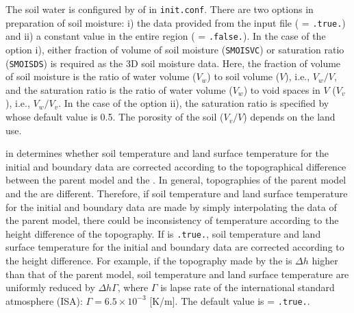 The soil water is configured by  of  in \verb|init.conf|.
There are two options in preparation of soil moisture: i) the data provided from the input file ( = \verb|.true.|) and ii) a constant value in the entire region ( = \verb|.false.|).
In the case of the option i), either fraction of volume of soil moisture (\verb|SMOISVC|) or saturation ratio (\verb|SMOISDS|) is required as the 3D soil moisture data.
Here, the fraction of volume of soil moisture is the ratio of water volume ($V_w$) to soil volume ($V$), i.e., $V_w / V$, 
and the saturation ratio is the ratio of water volume ($V_w$) to void spaces in $V$ ($V_v$), i.e., $V_w / V_v$.
%
In the case of the option ii), the saturation ratio is specified by  whose default value is 0.5.
The porosity of the soil ($V_v/V$) depends on the land use.

 in  determines
whether soil temperature and land surface temperature for the initial and boundary data are corrected
according to the topographical difference between the parent model and the \scalerm.
In general, topographies of the parent model and the \scalerm are different.
Therefore, if soil temperature and land surface temperature for the initial and boundary data are made by simply interpolating the data of the parent model,
there could be inconsistency of temperature according to the height difference of the topography.
If  is \verb|.true.|,
soil temperature and land surface temperature for the initial and boundary data are corrected according to the height difference.
For example, if the topography made by the \scalerm is $\Delta h$ higher than that of the parent model,
soil temperature and land surface temperature are uniformly reduced by $\Delta h\Gamma$,
where $\Gamma$ is lapse rate of the international standard atmosphere (ISA): $\Gamma=6.5\times 10^{-3}$ [K/m].
The default value is  = \verb|.true.|.

